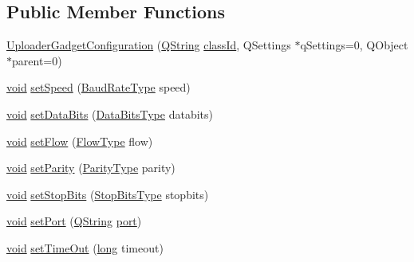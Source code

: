 \subsection*{Public Member Functions}
\begin{DoxyCompactItemize}
\item 
\hyperlink{group___y_modem_uploader_ga1c78df01d106cba6d5b3cb6103df5588}{Uploader\-Gadget\-Configuration} (\hyperlink{group___u_a_v_objects_plugin_gab9d252f49c333c94a72f97ce3105a32d}{Q\-String} \hyperlink{group___core_plugin_gac953657221ba7fda967ada0408332641}{class\-Id}, Q\-Settings $\ast$q\-Settings=0, Q\-Object $\ast$parent=0)
\item 
\hyperlink{group___u_a_v_objects_plugin_ga444cf2ff3f0ecbe028adce838d373f5c}{void} \hyperlink{group___y_modem_uploader_ga44c9e2b2f4fc691f67440a125a0d3466}{set\-Speed} (\hyperlink{qextserialport_8h_a6f031169a6a9b150b5af707bb23cf010}{Baud\-Rate\-Type} speed)
\item 
\hyperlink{group___u_a_v_objects_plugin_ga444cf2ff3f0ecbe028adce838d373f5c}{void} \hyperlink{group___y_modem_uploader_ga1da0d34ca3a5840687f53cdb4da50992}{set\-Data\-Bits} (\hyperlink{qextserialport_8h_a189ef78c2c1b7537ab114d576f6214fa}{Data\-Bits\-Type} databits)
\item 
\hyperlink{group___u_a_v_objects_plugin_ga444cf2ff3f0ecbe028adce838d373f5c}{void} \hyperlink{group___y_modem_uploader_ga69e8d13e1ed2fc41872ecf7c5447aa8b}{set\-Flow} (\hyperlink{qextserialport_8h_a02ad1c7cf791a069dd54e409f8db4790}{Flow\-Type} flow)
\item 
\hyperlink{group___u_a_v_objects_plugin_ga444cf2ff3f0ecbe028adce838d373f5c}{void} \hyperlink{group___y_modem_uploader_ga842e10f0bd593c16293486664f0892bd}{set\-Parity} (\hyperlink{qextserialport_8h_aee22d32d87c815090354bf9b8e957ace}{Parity\-Type} parity)
\item 
\hyperlink{group___u_a_v_objects_plugin_ga444cf2ff3f0ecbe028adce838d373f5c}{void} \hyperlink{group___y_modem_uploader_ga4207c9c91330ae30a22867c428ade5e5}{set\-Stop\-Bits} (\hyperlink{qextserialport_8h_adc8078895cd941d755d46633b54d3e7f}{Stop\-Bits\-Type} stopbits)
\item 
\hyperlink{group___u_a_v_objects_plugin_ga444cf2ff3f0ecbe028adce838d373f5c}{void} \hyperlink{group___y_modem_uploader_gae74e20b5d71cdb225b581729bda7ef38}{set\-Port} (\hyperlink{group___u_a_v_objects_plugin_gab9d252f49c333c94a72f97ce3105a32d}{Q\-String} \hyperlink{classport}{port})
\item 
\hyperlink{group___u_a_v_objects_plugin_ga444cf2ff3f0ecbe028adce838d373f5c}{void} \hyperlink{group___y_modem_uploader_ga4d3805496006d3cfdd8d1665d2b11654}{set\-Time\-Out} (\hyperlink{ioapi_8h_a3c7b35ad9dab18b8310343c201f7b27e}{long} timeout)

\end{DoxyCompactItemize}
